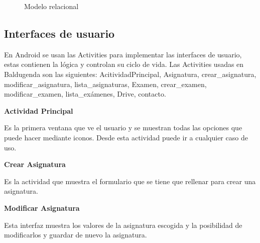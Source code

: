 \begin{figure}[H] 
  \begin{center} 
    \caption{Modelo relacional} 
    \label{fig:ModeloRelacional} 
  \end{center} 
\end{figure}

\subsection{Interfaces de usuario}
\label{subsecc:Interfaces de usuario}

En Android se usan las Activities para implementar las interfaces de usuario, estas contienen la lógica y controlan su ciclo de vida.
Las Activities usadas en Baldugenda son las siguientes: AcitividadPrincipal, Asignatura, crear\_asignatura, modificar\_asignatura, lista\_asignaturas, Examen, crear\_examen, modificar\_examen, lista\_exámenes, Drive, contacto.

\textbf{Actividad Principal}

Es la primera ventana que ve el usuario y se muestran todas las opciones que puede hacer mediante iconos.
Desde esta actividad puede ir a cualquier  caso de uso.

\textbf{Crear Asignatura}

Es la actividad que muestra el formulario que se tiene que rellenar para crear una asignatura.

\textbf{Modificar Asignatura}

Esta interfaz muestra los valores de la asignatura escogida y la posibilidad de modificarlos y guardar de nuevo la asignatura.

